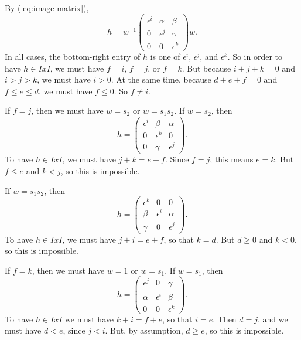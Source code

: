 \documentclass{amsart}
\theoremstyle{definition}
\def\e{\epsilon}
\begin{document}
  By (\ref{eq:image-matrix}),
  \begin{equation*}
    h = w^{-1}\begin{pmatrix}
      \e^i & \alpha & \beta \\
      0 & \e^j & \gamma \\
      0 & 0 & \e^k    
    \end{pmatrix}w.
  \end{equation*}
  In all cases, the bottom-right entry of $h$ is one of $\e^i$, $\e^j$, and
  $\e^k$.  So in order to have $h \in IxI$, we must have $f = i$, $f=j$, or
  $f=k$.  But because $i + j + k = 0$ and $i > j > k$, we must have $i > 0$.
  At the same time, because $d + e + f = 0$ and $f \le e \le d$, we must have
  $f \le 0$.  So $f \neq i$.

  If $f = j$, then we must have $w = s_2$ or $w = s_1 s_2$.  If $w = s_2$, then
  \begin{equation*}
    h = \begin{pmatrix}
      \e^i & \beta & \alpha \\
      0 & \e^k & 0 \\
      0 & \gamma & \e^j    
    \end{pmatrix}.
  \end{equation*}
  To have $h \in IxI$, we must have $j + k = e + f$.  Since $f = j$, this means
  $e = k$.  But $f \le e$ and $k < j$, so this is impossible.

  If $w = s_1 s_2$, then
  \begin{equation*}
    h = \begin{pmatrix}
      \e^k & 0 & 0 \\
      \beta& \e^i & \alpha \\
      \gamma & 0 & \e^j    
    \end{pmatrix}.
  \end{equation*}
  To have $h \in IxI$, we must have $j + i = e + f$, so that $k = d$.  But $d
  \ge 0$ and $k < 0$, so this is impossible.
  
  If $f = k$, then we must have $w = 1$ or $w = s_1$. If $w = s_1$, then
  \begin{equation*}
    h = \begin{pmatrix}
      \e^j & 0 & \gamma \\
      \alpha & \e^i & \beta \\
      0 & 0 & \e^k    
    \end{pmatrix}.
  \end{equation*}
  To have $h \in IxI$ we must have $k + i = f + e$, so that $i = e$.  Then
  $d = j$, and we must have $d < e$, since $j < i$.  But, by assumption, $d \ge
  e$, so this is impossible.
\end{document}
